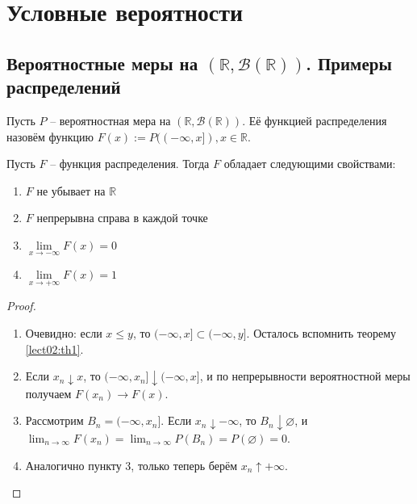 \section{Условные вероятности}
	
	\subsection{Вероятностные меры на $(\mathbb{R},\mathcal{B}(\mathbb{R}))$. Примеры распределений}
	
	\begin{definition}\label{lect03:def1}
	Пусть $P$ -- вероятностная мера на $(\mathbb{R},\mathcal{B}(\mathbb{R}))$. Её функцией распределения назовём функцию $F(x):=P((-\infty,x]), x\in\mathbb{R}$.
	\end{definition}
	
	\begin{theorem}\label{lect03:th1}
	Пусть $F$ -- функция распределения. Тогда $F$ обладает следующими свойствами:
	    \begin{enumerate}
	        \item $F$ не убывает на $\mathbb{R}$
	        \item $F$ непрерывна справа в каждой точке
	        \item $\lim\limits_{x\to -\infty}{F(x)} = 0$
	        \item $\lim\limits_{x\to +\infty}{F(x)} = 1$
	    \end{enumerate}
	\end{theorem}
	\begin{proof}
	    \begin{enumerate}
	        \item Очевидно: если $x\le y$, то $(-\infty,x]\subset (-\infty,y]$. Осталось вспомнить теорему \ref{lect02:th1}.
	        \item Если $x_n\downarrow x$, то $(-\infty,x_n]\downarrow(-\infty,x]$, и по непрерывности вероятностной меры получаем $F(x_n)\to F(x)$.
	        \item Рассмотрим $B_n=(-\infty,x_n]$. Если $x_n\downarrow -\infty$, то $B_n\downarrow\varnothing$, и\\ $\lim_{n\to\infty}F(x_n)=\lim_{n\to\infty}{P(B_n)}=P(\varnothing)=0$.
	        \item Аналогично пункту 3, только теперь берём $x_n\uparrow +\infty$.
	    \end{enumerate}
	\end{proof}
	
